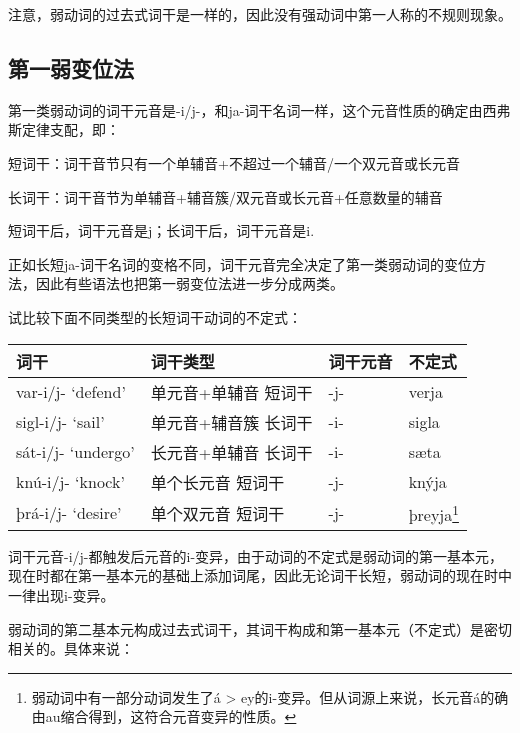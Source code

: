注意，弱动词的过去式词干是一样的，因此没有强动词中第一人称的不规则现象。

\subsection{第一弱变位法}\label{第一弱变位法}

第一类弱动词的词干元音是-i/j-，和ja-词干名词一样，这个元音性质的确定由西弗斯定律支配，即：

\begin{info}
    短词干：词干音节只有一个单辅音+不超过一个辅音/一个双元音或长元音

    长词干：词干音节为单辅音+辅音簇/双元音或长元音+任意数量的辅音

    短词干后，词干元音是j；长词干后，词干元音是i.
\end{info}

正如长短ja-词干名词的变格不同，词干元音完全决定了第一类弱动词的变位方法，因此有些语法也把第一弱变位法进一步分成两类。

试比较下面不同类型的长短词干动词的不定式：

\begin{longtable}{llll}
    \toprule
    词干                 & 词干类型        & 词干元音 & 不定式                            \\
    \midrule
    \endhead
    \bottomrule
    \endfoot
    var-i/j- `defend‌'  & 单元音+单辅音 短词干 & -j-  & verja                          \\
    sigl-i/j- `sail‌'   & 单元音+辅音簇 长词干 & -i-  & sigla                          \\
    sát-i/j- `undergo‌' & 长元音+单辅音 长词干 & -i-  & sæta                           \\
    knú-i/j- `knock'   & 单个长元音 短词干   & -j-  & knýja                          \\
    þrá-i/j- `desire'  & 单个双元音 短词干   & -j-  & þreyja\footnote{弱动词中有一部分动词发生了á
    > ey的i-变异。但从词源上来说，长元音á的确由au缩合得到，这符合元音变异的性质。}                             \\
\end{longtable}

词干元音-i/j-都触发后元音的i-变异，由于动词的不定式是弱动词的第一基本元，现在时都在第一基本元的基础上添加词尾，因此无论词干长短，弱动词的现在时中一律出现i-变异。

弱动词的第二基本元构成过去式词干，其词干构成和第一基本元（不定式）是密切相关的。具体来说：

